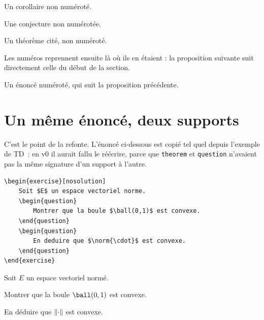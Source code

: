 \begin{corollary*}
    Un corollaire non numéroté.
\end{corollary*}

\begin{conjecture*}
    Une conjecture non numérotée.
\end{conjecture*}

\begin{citedtheorem*}
    Un théorème cité, non numéroté.
\end{citedtheorem*}

Les numéros reprennent ensuite là où ils en étaient : la proposition suivante
suit directement celle du début de la section.

\begin{proposition}
    Un énoncé numéroté, qui suit la proposition précédente.
\end{proposition}

\section{Un même énoncé, deux supports}%
\label{sec:portable}

C'est le point de la refonte. L'énoncé ci-dessous est copié tel quel depuis
l'exemple de TD~: en v0 il aurait fallu le réécrire, parce que
\texttt{theorem} et \texttt{question} n'avaient pas la même signature d'un
support à l'autre.

\begin{lstlisting}
\begin{exercise}[nosolution]
    Soit $E$ un espace vectoriel norme.
    \begin{question}
        Montrer que la boule $\ball(0,1)$ est convexe.
    \end{question}
    \begin{question}
        En deduire que $\norm{\cdot}$ est convexe.
    \end{question}
\end{exercise}
\end{lstlisting}
\begin{exercise}[nosolution]
    Soit $E$ un espace vectoriel normé.
    \begin{question}
        Montrer que la boule $\ball(0,1)$ est convexe.
    \end{question}
    \begin{question}
        En déduire que $\lVert\cdot\rVert$ est convexe.
    \end{question}
\end{exercise}
